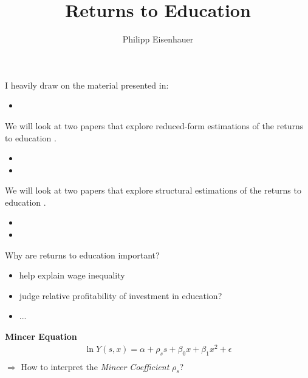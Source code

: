 

\title{Returns to Education}
\author{Philipp Eisenhauer}

\date{}

\let\otp\titlepage


\maketitle

 \begin{frame}

 I heavily draw on the material presented in:

\begin{itemize}
\item {}
\end{itemize}

\end{frame}


 \begin{frame}
We will look at two papers that explore reduced-form estimations of the returns to education
.
\begin{itemize}
\item {}
\item {}
\end{itemize}
 \end{frame}

 \begin{frame}
We will look at two papers that explore structural estimations of the returns to education
.
\begin{itemize}
\item {}
\item {}
\end{itemize}
 \end{frame}


\begin{frame}
Why are returns to education important?
\begin{itemize}
\item help explain wage inequality
\item judge relative profitability of investment in education?
\item ...
\end{itemize}
\end{frame}

\begin{frame}\nocite{Mincer.1958,Mincer.1974}
\textbf{Mincer Equation}\\
\begin{align*}
\ln Y(s, x) = \alpha + \rho_s s + \beta_0 x + \beta_1 x^2 + \epsilon\\
\end{align*}
$\Rightarrow$ How to interpret the \textit{Mincer Coefficient} $\rho_s$?
\end{frame}




